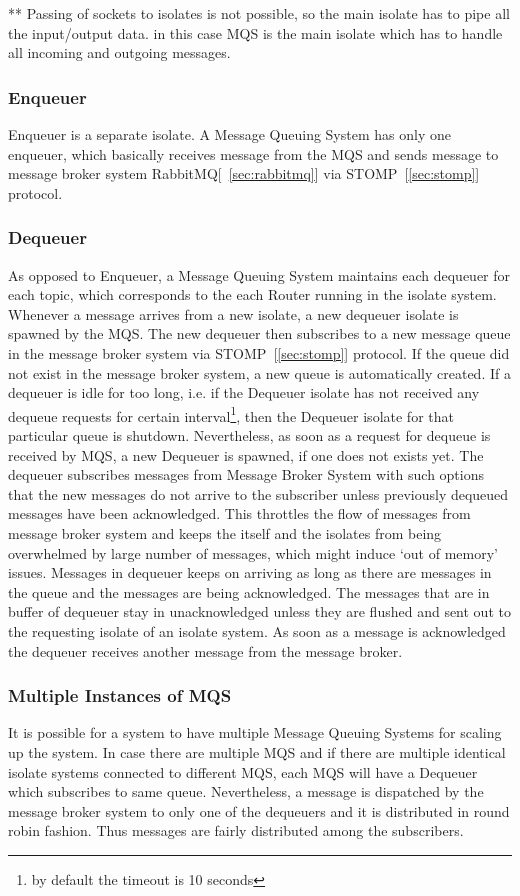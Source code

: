 ** Passing of sockets to isolates is not possible, so the main isolate has to pipe all the input/output data.
in this case MQS is the main isolate which has to handle all incoming and outgoing messages.

  \subsubsection{Enqueuer}
  Enqueuer is a separate isolate. A Message Queuing System has only one enqueuer, which basically receives message from the MQS and sends message to message broker system \textendash{} RabbitMQ[~\ref{sec:rabbitmq}] via STOMP~[\ref{sec:stomp}] protocol.

  \subsubsection{Dequeuer}
  As opposed to Enqueuer, a Message Queuing System maintains each dequeuer for each topic, which corresponds to the each Router running in the isolate system. Whenever a message arrives from a new isolate, a new dequeuer isolate is spawned by the MQS. The new dequeuer then subscribes to a new message queue in the message broker system via STOMP~[\ref{sec:stomp}] protocol. If the queue did not exist in the message broker system, a new queue is automatically created. If a dequeuer is idle for too long, i.e. if the Dequeuer isolate has not received any dequeue requests for certain interval\footnote{by default the timeout is 10 seconds}, then the Dequeuer isolate for that particular queue is shutdown. Nevertheless, as soon as a request for dequeue is received by MQS, a new Dequeuer is spawned, if one does not exists yet.
  The dequeuer subscribes messages from Message Broker System with such options that the new messages do not arrive to the subscriber unless previously dequeued messages have been acknowledged. This throttles the flow of messages from message broker system and keeps the itself and the isolates from being overwhelmed by large number of messages, which might induce ‘out of memory’ issues.
  Messages in dequeuer keeps on arriving as long as there are messages in the queue and the messages are being acknowledged. The messages that are in buffer of dequeuer stay in unacknowledged unless they are flushed and sent out to the requesting isolate of an isolate system. As soon as a message is acknowledged the dequeuer receives another message from the message broker.

  \subsubsection{Multiple Instances of MQS}
  It is possible for a system to have multiple Message Queuing Systems for scaling up the system. In case there are multiple MQS and if there are multiple identical isolate systems connected to different MQS, each MQS will have a Dequeuer which subscribes to same queue. Nevertheless, a message is dispatched by the message broker system to only one of the dequeuers and it is distributed in round robin fashion. Thus messages are fairly distributed among the subscribers.

